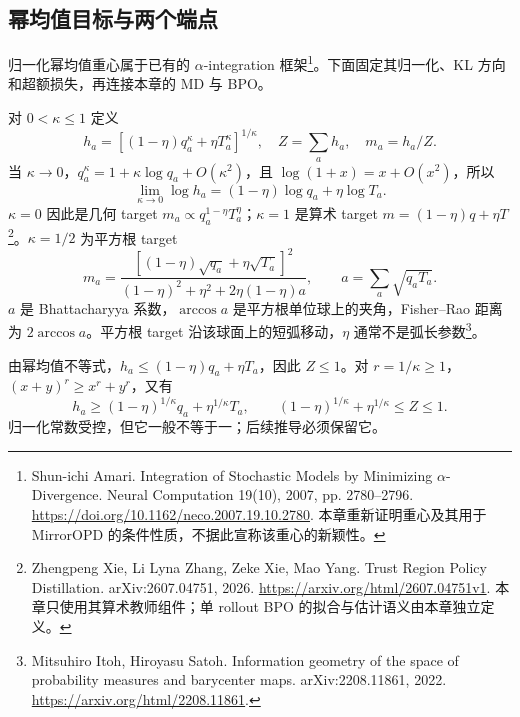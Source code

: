 \documentclass[lang=cn,scheme=chinese,openany]{../book/elegantbook}
\begin{document}


\subsection{幂均值目标与两个端点}

归一化幂均值重心属于已有的 $\alpha$-integration 框架\footnote{Shun-ichi Amari. Integration of Stochastic Models by Minimizing $\alpha$-Divergence. Neural Computation 19(10), 2007, pp. 2780--2796. \url{https://doi.org/10.1162/neco.2007.19.10.2780}. 本章重新证明重心及其用于 MirrorOPD 的条件性质，不据此宣称该重心的新颖性。}。下面固定其归一化、KL 方向和超额损失，再连接本章的 MD 与 BPO。

对 $0<\kappa\le1$ 定义
\begin{equation}
 h_a=[(1-\eta)q_a^\kappa+\eta T_a^\kappa]^{1/\kappa},\quad
 Z=\sum_ah_a,\quad m_a=h_a/Z.
 \label{eq:proximal-power-target}
\end{equation}
当 $\kappa\to0$，$q_a^\kappa=1+\kappa\log q_a+O(\kappa^2)$，且 $\log(1+x)=x+O(x^2)$，所以
\begin{equation}
 \lim_{\kappa\to0}\log h_a=(1-\eta)\log q_a+\eta\log T_a.
\end{equation}
$\kappa=0$ 因此是几何 target $m_a\propto q_a^{1-\eta}T_a^\eta$；$\kappa=1$ 是算术 target $m=(1-\eta)q+\eta T$\footnote{Zhengpeng Xie, Li Lyna Zhang, Zeke Xie, Mao Yang. Trust Region Policy Distillation. arXiv:2607.04751, 2026. \url{https://arxiv.org/html/2607.04751v1}. 本章只使用其算术教师组件；单 rollout BPO 的拟合与估计语义由本章独立定义。}。$\kappa=1/2$ 为平方根 target
\begin{equation}
 m_a=\frac{[(1-\eta)\sqrt{q_a}+\eta\sqrt{T_a}]^2}
 {(1-\eta)^2+\eta^2+2\eta(1-\eta)a},\qquad
 a=\sum_a\sqrt{q_aT_a}.
 \label{eq:proximal-square-root}
\end{equation}
$a$ 是 Bhattacharyya 系数，$\arccos a$ 是平方根单位球上的夹角，Fisher--Rao 距离为 $2\arccos a$。平方根 target 沿该球面上的短弧移动，$\eta$ 通常不是弧长参数\footnote{Mitsuhiro Itoh, Hiroyasu Satoh. Information geometry of the space of probability measures and barycenter maps. arXiv:2208.11861, 2022. \url{https://arxiv.org/html/2208.11861}.}。

由幂均值不等式，$h_a\le(1-\eta)q_a+\eta T_a$，因此 $Z\le1$。对 $r=1/\kappa\ge1$，$(x+y)^r\ge x^r+y^r$，又有
\begin{equation}
 h_a\ge(1-\eta)^{1/\kappa}q_a+\eta^{1/\kappa}T_a,
 \qquad
 (1-\eta)^{1/\kappa}+\eta^{1/\kappa}\le Z\le1.
\end{equation}
归一化常数受控，但它一般不等于一；后续推导必须保留它。
\end{document}
